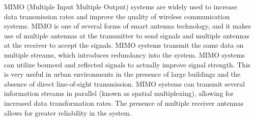  \label{sec:gram_schmidt}

\vspace*{-17 pt}

\vspace*{13 pt}


MIMO (Multiple Input Multiple Output) systems are widely used to increase data transmission rates and improve the quality of wireless communication systems.  MIMO is one of several forms of smart antenna technology, and it makes use of multiple antennas at the transmitter to send signals and multiple antennas at the receiver to accept the signals. MIMO systems transmit the same data on multiple streams, which introduces redundancy into the system. MIMO systems can utilize bounced and reflected signals to actually improve signal strength. This is very useful in urban environments in the presence of large buildings and the absence of direct line-of-sight transmission. MIMO systems can transmit several information streams in parallel (known as spatial multiplexing), allowing for increased data transformation rates. The presence of multiple receiver antennas allows for greater reliability in the system. 

